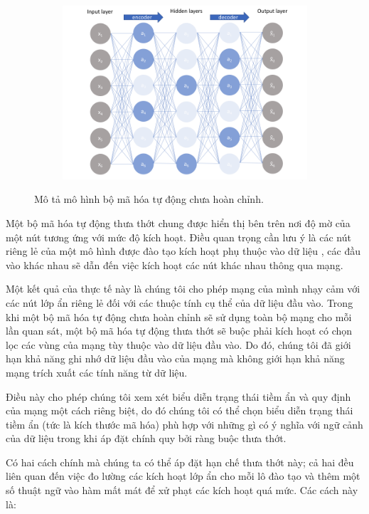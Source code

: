\begin{figure}
    \begin{subfigure}{0.8\textwidth}
        \includegraphics[width=1.\linewidth]{Chapters/items/auto4.jpg}
        \caption{}
        \label{fig: auto4}
    \end{subfigure}
    \caption{Mô tả mô hình bộ mã hóa tự động chưa hoàn chỉnh.}
\end{figure}

\newpage
Một bộ mã hóa tự động thưa thớt chung được hiển thị bên trên nơi
độ mờ của một nút tương ứng với mức độ kích hoạt. Điều quan
trọng cần lưu ý là các nút riêng lẻ của một mô hình được đào
tạo kích hoạt phụ thuộc vào dữ liệu , các đầu vào khác nhau
sẽ dẫn đến việc kích hoạt các nút khác nhau thông qua mạng.

Một kết quả của thực tế này là chúng tôi cho phép mạng của
mình nhạy cảm với các nút lớp ẩn riêng lẻ đối với các thuộc
tính cụ thể của dữ liệu đầu vào. Trong khi một bộ mã hóa tự động
chưa hoàn chỉnh sẽ sử dụng toàn bộ mạng cho mỗi lần quan sát,
một bộ mã hóa tự động thưa thớt sẽ buộc phải kích hoạt có chọn lọc
các vùng của mạng tùy thuộc vào dữ liệu đầu vào. Do đó, chúng
tôi đã giới hạn khả năng ghi nhớ dữ liệu đầu vào của mạng mà
không giới hạn khả năng mạng trích xuất các tính năng từ dữ liệu.

Điều này cho phép chúng tôi xem xét biểu diễn trạng thái tiềm ẩn
và quy định của mạng một cách riêng biệt, do đó chúng tôi có thể
chọn biểu diễn trạng thái tiềm ẩn (tức là kích thước mã hóa) phù
hợp với những gì có ý nghĩa với ngữ cảnh của dữ liệu trong khi áp
đặt chính quy bởi ràng buộc thưa thớt.

Có hai cách chính mà chúng ta có thể áp đặt hạn chế thưa thớt này;
cả hai đều liên quan đến việc đo lường các kích hoạt lớp ẩn
cho mỗi lô đào tạo và thêm một số thuật ngữ vào hàm mất mát để
xử phạt các kích hoạt quá mức. Các cách này là:

